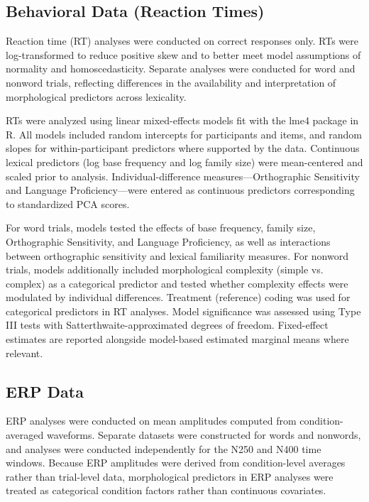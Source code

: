 \documentclass[preprint,12pt, authoryear, review]{elsarticle}
\begin{document}
\subsection{Behavioral Data (Reaction Times)}

Reaction time (RT) analyses were conducted on correct responses only. RTs were log-transformed to reduce positive skew and to better meet model assumptions of normality and homoscedasticity. Separate analyses were conducted for word and nonword trials, reflecting differences in the availability and interpretation of morphological predictors across lexicality.

RTs were analyzed using linear mixed-effects models fit with the lme4 package in R. All models included random intercepts for participants and items, and random slopes for within-participant predictors where supported by the data. Continuous lexical predictors (log base frequency and log family size) were mean-centered and scaled prior to analysis. Individual-difference measures—Orthographic Sensitivity and Language Proficiency—were entered as continuous predictors corresponding to standardized PCA scores.

For word trials, models tested the effects of base frequency, family size, Orthographic Sensitivity, and Language Proficiency, as well as interactions between orthographic sensitivity and lexical familiarity measures. For nonword trials, models additionally included morphological complexity (simple vs. complex) as a categorical predictor and tested whether complexity effects were modulated by individual differences. Treatment (reference) coding was used for categorical predictors in RT analyses. Model significance was assessed using Type III tests with Satterthwaite-approximated degrees of freedom. Fixed-effect estimates are reported alongside model-based estimated marginal means where relevant.

\subsection{ERP Data}

ERP analyses were conducted on mean amplitudes computed from condition-averaged waveforms. Separate datasets were constructed for words and nonwords, and analyses were conducted independently for the N250 and N400 time windows. Because ERP amplitudes were derived from condition-level averages rather than trial-level data, morphological predictors in ERP analyses were treated as categorical condition factors rather than continuous covariates.
\end{document}
